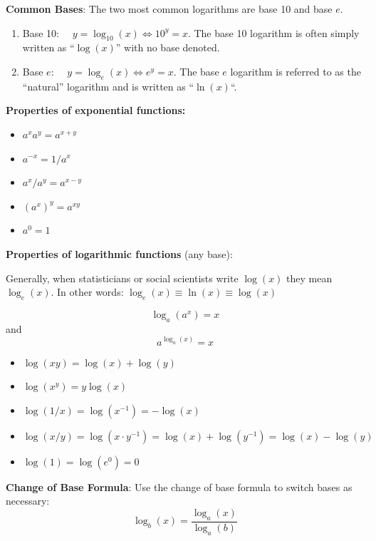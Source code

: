 \documentclass[]{book}
\providecommand{\tightlist}{%
  \setlength{\itemsep}{0pt}\setlength{\parskip}{0pt}}
\theoremstyle{definition}
\theoremstyle{definition}
\theoremstyle{definition}
\theoremstyle{remark}
\begin{document}
\textbf{Common Bases}: The two most common logarithms are base 10 and
base \(e\).

\begin{enumerate}
\def\labelenumi{\arabic{enumi}.}
\tightlist
\item
  Base 10: \(\quad y=\log_{10}(x) \iff 10^y=x\). The base 10 logarithm
  is often simply written as ``\(\log(x)\)'' with no base denoted.
\item
  Base \(e\): \(\quad y=\log_e(x) \iff e^y=x\). The base \(e\) logarithm
  is referred to as the ``natural'' logarithm and is written as
  ``\(\ln(x)\)``.
\end{enumerate}

\textbf{Properties of exponential functions:}

\begin{itemize}
\tightlist
\item
  \(a^x a^y = a^{x+y}\)
\item
  \(a^{-x} = 1/a^x\)
\item
  \(a^x/a^y = a^{x-y}\)
\item
  \((a^x)^y = a^{x y}\)
\item
  \(a^0 = 1\)
\end{itemize}

\textbf{Properties of logarithmic functions} (any base):

Generally, when statisticians or social scientists write \(\log(x)\)
they mean \(\log_e(x)\). In other words:
\(\log_e(x) \equiv \ln(x) \equiv \log(x)\)

\[\log_a(a^x)=x\] and \[a^{\log_a(x)}=x\]

\begin{itemize}
\tightlist
\item
  \(\log(x y)=\log(x)+\log(y)\)
\item
  \(\log(x^y)=y\log(x)\)
\item
  \(\log(1/x)=\log(x^{-1})=-\log(x)\)
\item
  \(\log(x/y)=\log(x\cdot y^{-1})=\log(x)+\log(y^{-1})=\log(x)-\log(y)\)
\item
  \(\log(1)=\log(e^0)=0\)
\end{itemize}

\textbf{Change of Base Formula}: Use the change of base formula to
switch bases as necessary: \[\log_b(x) = \frac{\log_a(x)}{\log_a(b)}\]
\end{document}
